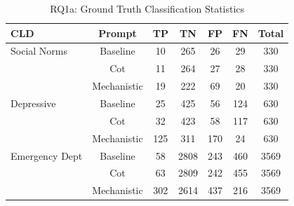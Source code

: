 \begin{table}[htbp]
\centering
\caption{RQ1a: Ground Truth Classification Statistics}
\label{tab:rq1a_gt_classification}
\begin{tabular}{lcccccc}
\toprule
\textbf{CLD} & \textbf{Prompt} & \textbf{TP} & \textbf{TN} & \textbf{FP} & \textbf{FN} & \textbf{Total} \\
\midrule
Social Norms & Baseline & 10 & 265 & 26 & 29 & 330 \\
 & Cot & 11 & 264 & 27 & 28 & 330 \\
 & Mechanistic & 19 & 222 & 69 & 20 & 330 \\
\midrule
Depressive & Baseline & 25 & 425 & 56 & 124 & 630 \\
 & Cot & 32 & 423 & 58 & 117 & 630 \\
 & Mechanistic & 125 & 311 & 170 & 24 & 630 \\
\midrule
Emergency Dept & Baseline & 58 & 2808 & 243 & 460 & 3569 \\
 & Cot & 63 & 2809 & 242 & 455 & 3569 \\
 & Mechanistic & 302 & 2614 & 437 & 216 & 3569 \\
\midrule
\bottomrule
\end{tabular}
\end{table}
